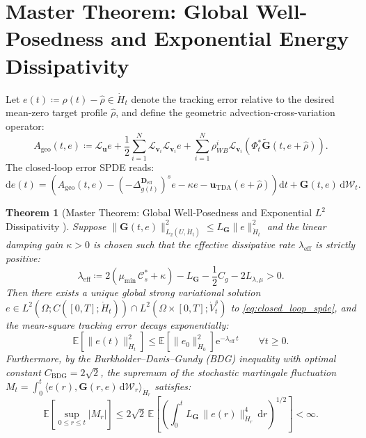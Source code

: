 \documentclass[11pt,a4paper,reqno]{article}
\theoremstyle{plain}
\newtheorem{theorem}{Theorem}[section]
\theoremstyle{definition}
\theoremstyle{remark}
\numberwithin{equation}{section}
\begin{document}
\section{Master Theorem: Global Well-Posedness and Exponential Energy Dissipativity}
\label{sec:master_theorem}

Let $e(t) \coloneqq \rho(t) - \hat{\rho} \in \dot{H}_t$ denote the tracking error relative to the desired mean-zero target profile $\hat{\rho}$, and define the geometric advection-cross-variation operator:
\begin{equation}\label{eq:ageo_def}
  A_{\mathrm{geo}}(t, e) \coloneqq \mathcal{L}_{\mathbf{u}} e + \frac{1}{2} \sum_{i=1}^N \mathcal{L}_{\mathbf{v}_i} \mathcal{L}_{\mathbf{v}_i} e + \sum_{i=1}^N \rho_{WB}^i \mathcal{L}_{\mathbf{v}_i} \left( \Phi_t^* \tilde{\mathbf{G}}(t, e + \hat{\rho}) \right).
\end{equation}
The closed-loop error SPDE reads:
\begin{equation}\label{eq:closed_loop_spde}
  \mathrm{d}e(t) = \left( A_{\mathrm{geo}}(t, e) - (-\Delta_{g(t)}^{\mathbf{D}_{\mathrm{eff}}})^s e - \kappa e - \mathbf{u}_{\mathrm{TDA}}(e + \hat{\rho}) \right)\mathrm{d}t + \mathbf{G}(t, e)\,\mathrm{d}\mathcal{W}_t.
\end{equation}

\begin{theorem}[Master Theorem: Global Well-Posedness and Exponential $L^2$ Dissipativity \cite{ananda2026stochastic_fluid_v2, prevot2007concise, liu2015stochastic}]\label{thm:master_stability}
Suppose $\|\mathbf{G}(t,e)\|_{L_2(U,\dot{H}_t)}^2 \le L_{\mathbf{G}}\|e\|_{\dot{H}_t}^2$ and the linear damping gain $\kappa > 0$ is chosen such that the effective dissipative rate $\lambda_{\mathrm{eff}}$ is strictly positive:
\begin{equation}\label{eq:lambda_eff}
  \lambda_{\mathrm{eff}} \coloneqq 2\left(\mu_{\min}\,\mathcal{C}_s^* + \kappa\right) - L_{\mathbf{G}} - \frac{1}{2}C_g - 2 L_{\lambda,\mu} > 0.
\end{equation}
Then there exists a unique global strong variational solution $e \in L^2(\Omega; C([0,T]; \dot{H}_t)) \cap L^2(\Omega \times [0,T]; \dot{V}_t^s)$ to \eqref{eq:closed_loop_spde}, and the mean-square tracking error decays exponentially:
\begin{equation}\label{eq:exp_decay_bound}
  \mathbb{E}\!\left[ \|e(t)\|_{\dot{H}_t}^2 \right] \le \mathbb{E}\!\left[ \|e_0\|_{\dot{H}_0}^2 \right] \mathrm{e}^{-\lambda_{\mathrm{eff}}\,t} \qquad \forall t \ge 0.
\end{equation}
Furthermore, by the Burkholder--Davis--Gundy (BDG) inequality \cite{burkholder1973distribution, davis1976optimal} with optimal constant $C_{\mathrm{BDG}} = 2\sqrt{2}$, the supremum of the stochastic martingale fluctuation $M_t = \int_0^t \langle e(r), \mathbf{G}(r,e)\,\mathrm{d}\mathcal{W}_r \rangle_{\dot{H}_r}$ satisfies:
\begin{equation}\label{eq:bdg_bound}
  \mathbb{E}\!\left[ \sup_{0 \le r \le t} |M_r| \right] \le 2\sqrt{2}\, \mathbb{E}\!\left[ \left( \int_0^t L_{\mathbf{G}}\,\|e(r)\|_{\dot{H}_r}^4 \,\mathrm{d}r \right)^{1/2} \right] < \infty.
\end{equation}
\end{theorem}
\end{document}
